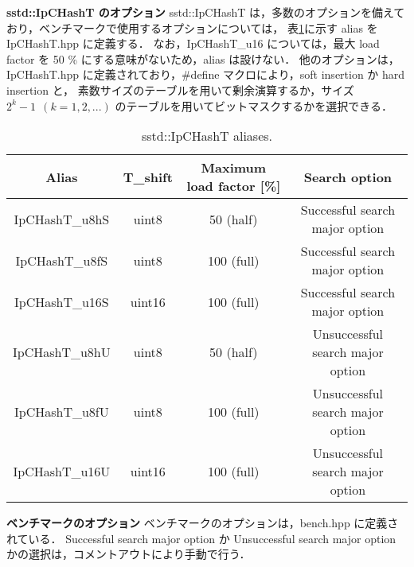 {\bf sstd::IpCHashT のオプション}
\samepage\newline\indent
sstd::IpCHashT は，多数のオプションを備えており，ベンチマークで使用するオプションについては，
表\ref{table_alias}に示す alias を IpCHashT.hpp に定義する．
なお，IpCHashT\_u16 については，最大 load factor を 50 \% にする意味がないため，alias は設けない．
他のオプションは，IpCHashT.hpp に定義されており，\#define マクロにより，soft insertion か hard insertion と，
素数サイズのテーブルを用いて剰余演算するか，サイズ $2^k-1\ \ (k=1,2,...)$ のテーブルを用いてビットマスクするかを選択できる．

\begin{table}[h]
  \begin{center}
    \fontsize{9pt}{10pt}\selectfont
    \caption{sstd::IpCHashT aliases.}
    \begin{tabular}{c|ccc} \hline
      Alias          & T\_shift & Maximum load factor [\%] \rule[0pt]{0pt}{10pt} & Search option \\ \hline
      IpCHashT\_u8hS & uint8    &  50 (half)                                     &   Successful search major option \rule[0pt]{0pt}{10pt} \\
      IpCHashT\_u8fS & uint8    & 100 (full)                                     &   Successful search major option \rule[0pt]{0pt}{10pt} \\
      IpCHashT\_u16S & uint16   & 100 (full)                                     &   Successful search major option \rule[0pt]{0pt}{10pt} \\
      IpCHashT\_u8hU & uint8    &  50 (half)                                     & Unsuccessful search major option \rule[0pt]{0pt}{10pt} \\
      IpCHashT\_u8fU & uint8    & 100 (full)                                     & Unsuccessful search major option \rule[0pt]{0pt}{10pt} \\
      IpCHashT\_u16U & uint16   & 100 (full)                                     & Unsuccessful search major option \rule[0pt]{0pt}{10pt} \\ \hline
    \end{tabular}
    \label{table_alias}
  \end{center}
\end{table}

{\bf ベンチマークのオプション}
\samepage\newline\indent
ベンチマークのオプションは，bench.hpp に定義されている．
Successful search major option か Unsuccessful search major option かの選択は，コメントアウトにより手動で行う．

